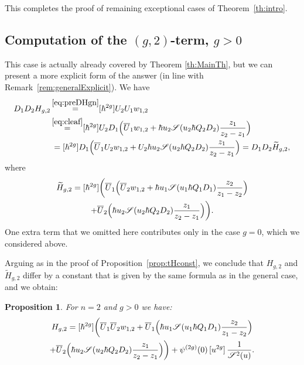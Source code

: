 \documentclass[11pt]{article}
\let\mathcal\mathscr
\theoremstyle{plain}
\newtheorem{proposition}[theorem]{Proposition}
\theoremstyle{definition}
\theoremstyle{remark}
\newcommand{\cS}{\mathcal{S}}
\begin{document}
This completes the proof of remaining exceptional cases of Theorem~\ref{th:intro}.

\subsection{Computation of the \texorpdfstring{$(g,2)$}{(g,2)}-term, \texorpdfstring{$g>0$}{g>0}}\label{sec:g2}
This case is actually already covered by Theorem \ref{th:MainTh}, but we can present a more explicit form of the answer (in line with Remark~\ref{rem:generalExplicit}). We have\vspace*{-3pt}
\begin{align*}
D_1D_2H_{g,2}&\mathop{=}^{\eqref{eq:preDHgn}}[\hbar^{2g}]U_2U_1w_{1,2}\\
&\mathop{=}^{\eqref{eq:cleaf}}
[\hbar^{2g}]U_2
D_1 \Bigl(\overline{U}_1 w_{1,2} + \hbar u_2 \cS(u_2\hbar Q_2D_2)\frac{z_1}{z_2-z_1}\Bigr)
\\
&\,=
[\hbar^{2g}]
D_1 \Bigl(\overline{U}_1 U_2 w_{1,2} + U_2\hbar u_2 \cS(u_2\hbar Q_2D_2)\frac{z_1}{z_2-z_1}\Bigr)
=
D_1 D_2\widetilde H_{g,2},
\end{align*}
where\vspace*{-3pt}
\begin{multline*}
\widetilde H_{g,2}=[\hbar^{2g}]\biggl(\overline{U}_1\Bigl(\overline{U}_2 w_{1,2}
+ \hbar u_1 \cS(u_1\hbar Q_1D_1)\frac{z_2}{z_1-z_2}\Bigr)\\
+\overline{U}_2\Bigl(\hbar u_2 \cS(u_2\hbar Q_2D_2)\frac{z_1}{z_2-z_1}\Bigr) \biggr).
\end{multline*}
One extra term that we omitted here contributes only in the case $g=0$, which we considered above.

Arguing as in the proof of Proposition~\ref{prop:tHconst}, we conclude that $H_{g,2}$ and $\widetilde H_{g,2}$ differ by a constant that is given by the same formula as in the general case, and we obtain:

\begin{proposition} For $n=2$ and $g>0$ we have:
\begin{multline*}
H_{g,2} =[\hbar^{2g}]\biggl(\overline{U}_1\overline{U}_2 w_{1,2}
+ \overline{U}_1\Bigl(\hbar u_1 \cS(u_1\hbar Q_1D_1)\frac{z_2}{z_1-z_2}\Bigr)
\\
+\overline{U}_2\Bigl(\hbar u_2 \cS(u_2\hbar Q_2D_2)\frac{z_1}{z_2-z_1}\Bigr)\biggr)
+ \psi^{(2g)}(0)\,[u^{2g}]\,\frac1{\cS^2(u)}.
\end{multline*}
\end{proposition}
\end{document}
